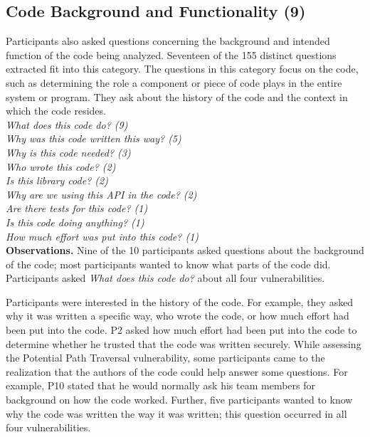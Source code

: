 \documentclass[conference]{IEEEtran}
\begin{document}


\noindent\subsection{\textbf{Code Background and Functionality (9)}}
\label{cbf}
Participants also asked questions concerning the background and intended function of the code being analyzed. 
Seventeen of the 155 distinct questions extracted fit into this category. 
The questions in this category focus on the code, such as determining the role a component or piece of code plays in the entire system or program.
They ask about the history of the code and the context in which the code resides.
\\

\noindent\emph{What does this code do? (9)} \\
\emph{Why was this code written this way? (5)} \\
\emph{Why is this code needed? (3)} \\
\emph{Who wrote this code? (2)} \\
\emph{Is this library code? (2)} \\
\emph{Why are we using this API in the code? (2)} \\
\emph{Are there tests for this code? (1)} \\
\emph{Is this code doing anything? (1)} \\
\emph{How much effort was put into this code? (1)} \\



\noindent\textbf{Observations.}
Nine of the 10 participants asked questions about the background of the code; most participants wanted to know what parts of the code did.
Participants asked \textit{What does this code do?} about all four vulnerabilities.

Participants were interested in the history of the code.
For example, they asked why it was written a specific way, who wrote the code, or how much effort had been put into the code.
P2 asked how much effort had been put into the code to determine whether he trusted that the code was written securely.
While assessing the Potential Path Traversal vulnerability, some participants came to the realization that the authors of the code could help answer some questions. 
For example, P10 stated that he would normally ask his team members for background on how the code worked.
Further, five participants wanted to know why the code was written the way it was written; this question occurred in all four vulnerabilities.
\\
\end{document}
